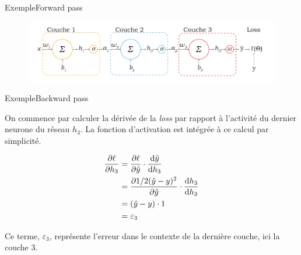 \documentclass[12pt,dvipsnames,aspectratio=169]{beamer}
\begin{document}
\begin{frame}{Exemple}{Forward pass}

\begin{figure}
    \centering
    \includegraphics[width=\textwidth]{figures/3couches.pdf}
\end{figure}

\end{frame}

\begin{frame}{Exemple}{Backward pass}

    On commence par calculer la dérivée de la \textit{loss} par rapport à l'activité du dernier neurone du réseau $h_3$. La fonction d'activation est intégrée à ce calcul par simplicité.
    
    \begin{align*}
        \pdv{\ell}{h_3} &= \pdv{\ell}{\hat{y}} \cdot \odv{\hat{y}}{h_3} \\
                        &= \pdv{1/2(\hat{y} - y)^2}{\hat{y}} \cdot \odv{h_3}{h_3} \\
                        &= (\hat{y} - y) \cdot 1 \\
                        &= \varepsilon_3
    \end{align*}

    Ce terme, $\varepsilon_3$, représente l'erreur dans le contexte de la dernière couche, ici la couche 3.
    
\end{frame}
\end{document}
